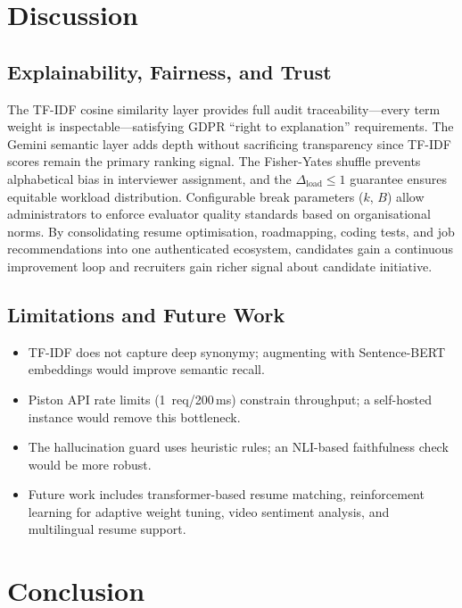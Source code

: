 \documentclass[conference]{IEEEtran}
\begin{document}
\section{Discussion}

\subsection{Explainability, Fairness, and Trust}

The TF-IDF cosine similarity layer provides full audit traceability—every term weight is inspectable—satisfying GDPR ``right to explanation'' requirements. The Gemini semantic layer adds depth without sacrificing transparency since TF-IDF scores remain the primary ranking signal. The Fisher-Yates shuffle prevents alphabetical bias in interviewer assignment, and the $\Delta_{\text{load}} \leq 1$ guarantee ensures equitable workload distribution. Configurable break parameters ($k$, $B$) allow administrators to enforce evaluator quality standards based on organisational norms. By consolidating resume optimisation, roadmapping, coding tests, and job recommendations into one authenticated ecosystem, candidates gain a continuous improvement loop and recruiters gain richer signal about candidate initiative.

\subsection{Limitations and Future Work}

\begin{itemize}
\item TF-IDF does not capture deep synonymy; augmenting with Sentence-BERT embeddings would improve semantic recall.
\item Piston API rate limits (1~req/200\,ms) constrain throughput; a self-hosted instance would remove this bottleneck.
\item The hallucination guard uses heuristic rules; an NLI-based faithfulness check would be more robust.
\item Future work includes transformer-based resume matching, reinforcement learning for adaptive weight tuning, video sentiment analysis, and multilingual resume support.
\end{itemize}

\section{Conclusion}
\end{document}
